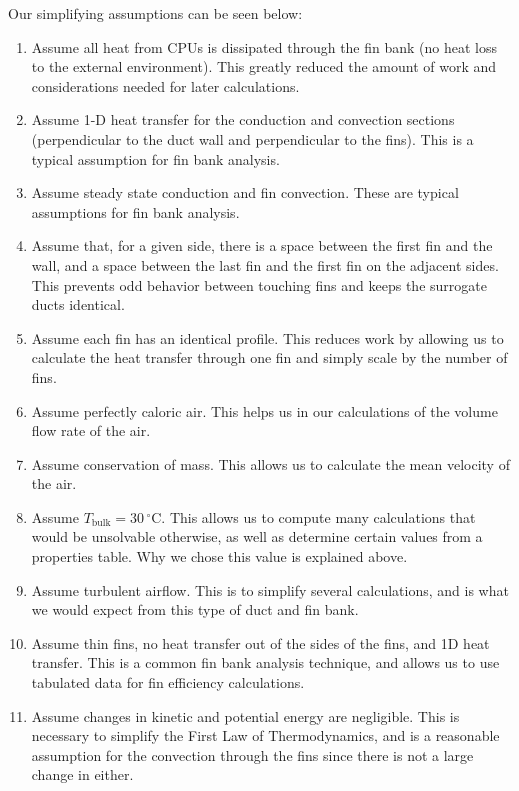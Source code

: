 \documentclass[12pt, titlepage]{article}
\begin{document}
Our simplifying assumptions can be seen below:
\begin{enumerate}
\item Assume all heat from CPUs is dissipated through the fin bank (no heat loss to the external environment). This greatly reduced the amount of work and considerations needed for later calculations. 

\item Assume 1-D heat transfer for the conduction and convection sections (perpendicular to the duct wall and perpendicular to the fins). This is a typical assumption for fin bank analysis. 

\item Assume steady state conduction and fin convection. These are typical assumptions for fin bank analysis.

\item Assume that, for a given side, there is a space between the first fin and the wall, and a space between the last fin and the first fin on the adjacent sides. This prevents odd behavior between touching fins and keeps the surrogate ducts identical.

\item Assume each fin has an identical profile. This reduces work by allowing us to calculate the heat transfer through one fin and simply scale by the number of fins.

\item Assume perfectly caloric air. This helps us in our calculations of the volume flow rate of the air.

\item Assume conservation of mass. This allows us to calculate the mean velocity of the air.

\item Assume $T_{\text{bulk}} = 30\,^\circ\mathrm{C}$. This allows us to compute many calculations that would be unsolvable otherwise, as well as determine certain values from a properties table. Why we chose this value is explained above.

\item Assume turbulent airflow. This is to simplify several calculations, and is what we would expect from this type of duct and fin bank.

\item Assume thin fins, no heat transfer out of the sides of the fins, and 1D heat transfer. This is a common fin bank analysis technique, and allows us to use tabulated data for fin efficiency calculations.

\item Assume changes in kinetic and potential energy are negligible. This is necessary to simplify the First Law of Thermodynamics, and is a reasonable assumption for the convection through the fins since there is not a large change in either. %
\end{enumerate}
\end{document}
